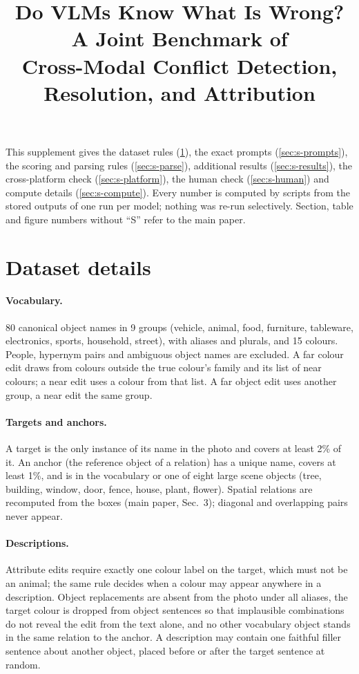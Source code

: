\documentclass[10pt,twocolumn,letterpaper]{article}
\title{Do VLMs Know What Is Wrong? A Joint Benchmark of\\Cross-Modal Conflict Detection, Resolution, and Attribution}
\begin{document}
\maketitlesupplementary

This supplement gives the dataset rules (\cref{sec:s-data}), the exact prompts (\cref{sec:s-prompts}), the scoring and parsing rules (\cref{sec:s-parse}), additional results (\cref{sec:s-results}), the cross-platform check (\cref{sec:s-platform}), the human check (\cref{sec:s-human}) and compute details (\cref{sec:s-compute}). Every number is computed by scripts from the stored outputs of one run per model; nothing was re-run selectively. Section, table and figure numbers without ``S'' refer to the main paper.

\section{Dataset details}
\label{sec:s-data}

\paragraph{Vocabulary.} 80 canonical object names in 9 groups (vehicle, animal, food, furniture, tableware, electronics, sports, household, street), with aliases and plurals, and 15 colours. People, hypernym pairs and ambiguous object names are excluded. A far colour edit draws from colours outside the true colour's family and its list of near colours; a near edit uses a colour from that list. A far object edit uses another group, a near edit the same group.

\paragraph{Targets and anchors.} A target is the only instance of its name in the photo and covers at least 2\% of it. An anchor (the reference object of a relation) has a unique name, covers at least 1\%, and is in the vocabulary or one of eight large scene objects (tree, building, window, door, fence, house, plant, flower). Spatial relations are recomputed from the boxes (main paper, Sec.~3); diagonal and overlapping pairs never appear.

\paragraph{Descriptions.} Attribute edits require exactly one colour label on the target, which must not be an animal; the same rule decides when a colour may appear anywhere in a description. Object replacements are absent from the photo under all aliases, the target colour is dropped from object sentences so that implausible combinations do not reveal the edit from the text alone, and no other vocabulary object stands in the same relation to the anchor. A description may contain one faithful filler sentence about another object, placed before or after the target sentence at random.
\end{document}
